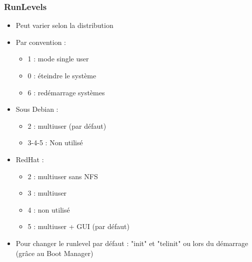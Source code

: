 \documentclass[a4paper]{article}
\begin{document}
      \subsubsection{RunLevels}
      \begin{itemize}[label = \textbullet, font = \Large]
        \item Peut varier selon la distribution
        \item Par convention :
        \begin{itemize}[label=, font=\scriptsize] 
          \item 1 : mode single user
          \item 0 : éteindre le système
          \item 6 : redémarrage systèmes
        \end{itemize}
        \item Sous Debian :
        \begin{itemize}[label=, font=\scriptsize] 
          \item 2 : multiuser (par défaut)
          \item 3-4-5 : Non utilisé
        \end{itemize}
        \item RedHat :
        \begin{itemize}[label=, font=\scriptsize] 
          \item 2 : multiuser sans NFS
          \item 3 : multiuser
          \item 4 : non utilisé
          \item 5 : multiuser + GUI (par défaut)
        \end{itemize}
        \item Pour changer le runlevel par défaut : "init" et "telinit" ou lors du démarrage (grâce au Boot Manager)
      \end{itemize}
\end{document}
